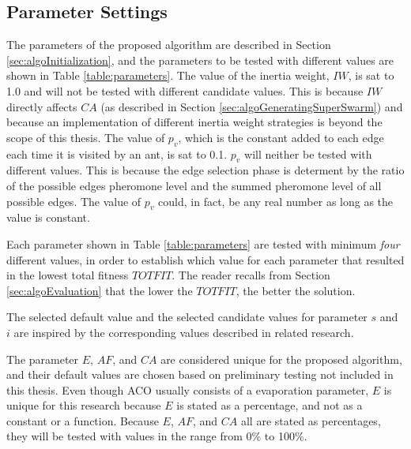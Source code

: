 \subsection{Parameter Settings}
\label{subsec:parameterSettings_setup}

The parameters of the proposed algorithm are described in Section \vref{sec:algoInitialization}, and the parameters 
to be tested with different values are shown in Table \vref{table:parameters}. The value of the inertia weight, $IW$, is sat to 1.0 and will not be tested with different candidate values. This is because $IW$ directly affects $CA$ (as described in Section \vref{sec:algoGeneratingSuperSwarm}) and because an implementation of different inertia weight strategies is beyond the scope of this thesis. The value of $p_v$, which is the constant added to each edge each time it is visited by an ant, is sat to 0.1. $p_v$ will neither be tested with different values. This is because the edge selection phase is determent by the ratio of the possible edges pheromone level and the summed pheromone level of all possible edges. The value of $p_v$ could, in fact, be any real number as long as the value is constant.

Each parameter shown in Table \vref{table:parameters} are tested with minimum \textit{four} different values, in order to establish which value for each parameter that resulted in the lowest total fitness $TOTFIT$. The reader recalls from Section \vref{sec:algoEvaluation} that the lower the $TOTFIT$, the better the solution. 

The selected default value and the selected candidate values for parameter $s$ and $i$ are inspired by the corresponding values described in related research\citep{salehi-nezhad07, poorzahedy11, sedighpour14, kechagiopoulos14}.

The parameter $E$, $AF$, and $CA$ are considered unique for the proposed algorithm, and their default values are chosen based on preliminary testing not included in this thesis. Even though ACO usually consists of a evaporation parameter, $E$ is unique for this research because $E$ is stated as a percentage, and not as a constant or a function. 
Because $E$, $AF$, and $CA$ all are stated as percentages, they will be tested with values in the range from 0\% to 100\%. %


